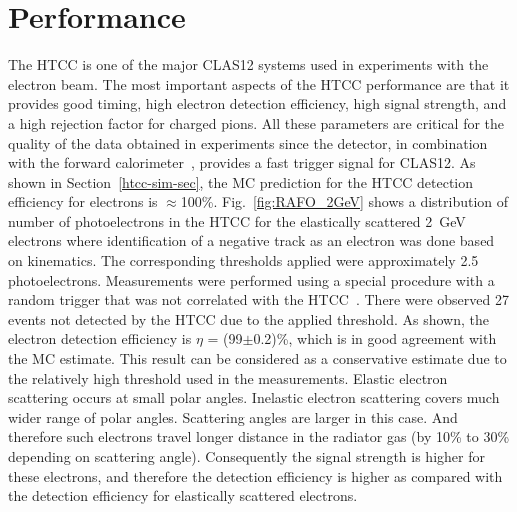 \section{Performance}

The HTCC is one of the major CLAS12 systems used in experiments with the electron beam. The most important
aspects of the HTCC performance are that it provides good timing, high electron detection efficiency, high signal
strength, and a high rejection factor for charged pions. All these parameters are critical for the quality of the data
obtained in experiments since the detector, in combination with the forward calorimeter~\cite{ec-nim}, provides a
fast trigger signal for CLAS12. As shown in Section~\ref{htcc-sim-sec}, the MC prediction for the HTCC
detection efficiency for electrons is $\approx$100\%. Fig.~\ref{fig:RAFO_2GeV} shows a distribution of number of photoelectrons in the HTCC for the elastically scattered 2~GeV electrons where identification of a negative track as an electron was done based on kinematics. The corresponding thresholds
applied were approximately 2.5 photoelectrons. Measurements were performed using a special procedure with a
random trigger that was not correlated with the HTCC~\cite{trigger-nim}. There were observed 27 events not
detected by the HTCC due to the applied threshold. As shown, the electron detection efficiency is $\eta$ =
(99$\pm$0.2)\%, which is in good agreement with the MC estimate. This result can be considered as a conservative
estimate due to the relatively high threshold used in the measurements. Elastic electron scattering occurs  at small polar angles.  Inelastic electron scattering covers much wider range of polar angles. Scattering angles are larger in this case. And therefore such electrons travel longer distance in the radiator gas (by 10\% to 30\% depending on scattering angle). Consequently the signal strength is higher for these electrons, and therefore the detection efficiency is higher as compared with the detection efficiency for elastically scattered electrons.  

